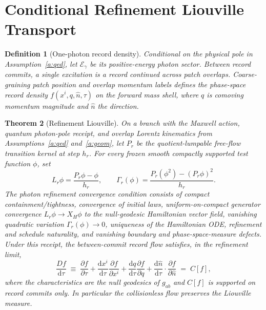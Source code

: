 \documentclass[11pt]{article}
\newtheorem{theorem}{Theorem}[section]
\newtheorem{definition}[theorem]{Definition}
\theoremstyle{remark}
\newcommand{\Dd}{\mathrm{d}}
\begin{document}
\section{Conditional Refinement Liouville Transport}

\begin{definition}[One-photon record density]
Conditional on the physical pole in Assumption~\ref{a:qed}, let
$\mathcal E_\gamma$ be its positive-energy photon sector. Between record
commits, a single excitation is a record continued
across patch overlaps. Coarse-graining patch position and overlap momentum
labels defines the phase-space record density $f(x^i,q,\hat n,\tau)$ on the
forward mass shell, where $q$ is comoving momentum magnitude and $\hat n$ the
direction.
\end{definition}

\begin{theorem}[Refinement Liouville]\label{t:liouville}
On a branch with the Maxwell action, quantum photon-pole receipt, and overlap
Lorentz kinematics from Assumptions~\ref{a:qed} and~\ref{a:geom}, let $P_r$ be the quotient-lumpable
free-flow transition kernel at step $h_r$. For every frozen smooth compactly
supported test function $\phi$, set
\[
L_r\phi=\frac{P_r\phi-\phi}{h_r},
\qquad
\Gamma_r(\phi)=
\frac{P_r(\phi^2)-(P_r\phi)^2}{h_r}.
\]
The photon refinement convergence condition consists of compact containment/tightness,
convergence of initial laws, uniform-on-compact generator convergence
$L_r\phi\to X_H\phi$ to the null-geodesic Hamiltonian vector field,
vanishing quadratic variation $\Gamma_r(\phi)\to0$, uniqueness of the
Hamiltonian ODE, refinement and schedule naturality, and vanishing boundary
and phase-space-measure defects. Under this receipt, the
between-commit record flow satisfies, in the refinement limit,
\[
\frac{Df}{\Dd\tau}\;\equiv\;
\frac{\partial f}{\partial\tau}
+\frac{\Dd x^i}{\Dd\tau}\frac{\partial f}{\partial x^i}
+\frac{\Dd q}{\Dd\tau}\frac{\partial f}{\partial q}
+\frac{\Dd\hat n}{\Dd\tau}\cdot\frac{\partial f}{\partial\hat n}
\;=\;C[f],
\]
where the characteristics are the null geodesics of $g_{ab}$ and $C[f]$ is
supported on record commits only. In particular the collisionless flow
preserves the Liouville measure.
\end{theorem}
\end{document}
